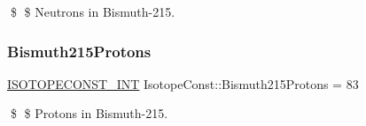 \$ \$ Neutrons in Bismuth-\/215. \mbox{\label{group___isotope_const-_bismuth-_bi215_ga057d1e426f91c5bc33c641031323da95}} 
\subsubsection{\texorpdfstring{Bismuth215\+Protons}{Bismuth215Protons}}
{\footnotesize\ttfamily \mbox{\hyperlink{group___isotope_const-_macros_ga5f18360b3e99483a35c32d789e62621c}{I\+S\+O\+T\+O\+P\+E\+C\+O\+N\+S\+T\+\_\+\+I\+NT}} Isotope\+Const\+::\+Bismuth215\+Protons = 83}

\$ \$ Protons in Bismuth-\/215. 